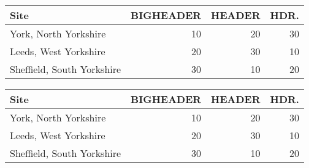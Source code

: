 \documentclass{article}
\begin{document}
\begin{table}[h!]
    \centering
    \begin{tabular}{lrrr}
    \toprule
        Site & BIGHEADER & HEADER & HDR. \\
    \midrule
        York, North Yorkshire & 10 & 20 & 30 \\
        Leeds, West Yorkshire & 20 & 30 & 10 \\
        Sheffield, South Yorkshire & 30 & 10 & 20 \\
    \bottomrule
    \end{tabular}
\end{table}

\begin{table}[h!]
    \centering
    \begin{tabularx}{\linewidth}{lRRR}
    \toprule
        Site & BIGHEADER & HEADER & HDR. \\
    \midrule
        York, North Yorkshire & 10 & 20 & 30 \\
        Leeds, West Yorkshire & 20 & 30 & 10 \\
        Sheffield, South Yorkshire & 30 & 10 & 20 \\
    \bottomrule
    \end{tabularx}
\end{table}
\end{document}
